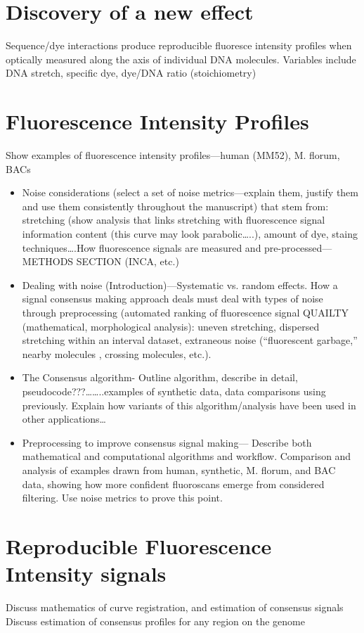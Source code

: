 \documentclass[11pt]{extarticle} %
\begin{document}
\section*{Discovery of a new effect}
Sequence/dye interactions produce reproducible fluoresce intensity profiles when optically measured along the axis of individual DNA molecules. Variables include DNA stretch, specific dye, dye/DNA ratio (stoichiometry)

\section*{Fluorescence Intensity Profiles}
Show examples of fluorescence intensity profiles—human (MM52), M. florum,  BACs
\begin{itemize}
\item Noise considerations (select a set of noise metrics—explain them, justify them and use them consistently throughout the manuscript) that stem from: stretching (show analysis that links stretching with fluorescence signal information content (this curve may look parabolic…..), amount of dye, staing techniques….How fluorescence signals are measured and pre-processed—METHODS SECTION (INCA, etc.)
\item Dealing with noise (Introduction)—Systematic vs. random effects. How a signal consensus making approach deals must deal with types of noise through preprocessing (automated ranking of fluorescence signal QUAILTY (mathematical, morphological analysis): uneven stretching, dispersed stretching within an interval dataset, extraneous noise (“fluorescent garbage,” nearby molecules , crossing molecules, etc.). 
\item The Consensus algorithm- Outline algorithm, describe in detail, pseudocode???……..examples of synthetic data, data comparisons using previously. Explain how variants of this algorithm/analysis have been used in other applications…
\item Preprocessing to improve consensus signal making— Describe both mathematical and computational algorithms and workflow. Comparison and analysis of examples drawn from human, synthetic, M. florum, and BAC data, showing how more confident fluoroscans emerge from considered filtering. Use noise metrics to prove this point.
\end{itemize}

\section*{Reproducible Fluorescence Intensity signals}
Discuss mathematics of curve registration, and estimation of consensus signals
Discuss estimation of consensus profiles for any region on the genome
\end{document}
